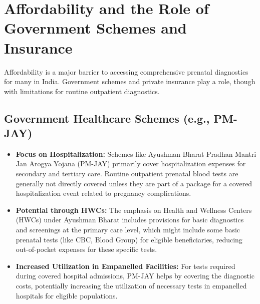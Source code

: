 \documentclass{article}
\begin{document}
\section{Affordability and the Role of Government Schemes and Insurance}

Affordability is a major barrier to accessing comprehensive prenatal diagnostics for many in India. Government schemes and private insurance play a role, though with limitations for routine outpatient diagnostics.

\subsection{Government Healthcare Schemes (e.g., PM-JAY)}
\begin{itemize}
    \item \textbf{Focus on Hospitalization:} Schemes like Ayushman Bharat Pradhan Mantri Jan Arogya Yojana (PM-JAY) primarily cover hospitalization expenses for secondary and tertiary care. Routine outpatient prenatal blood tests are generally not directly covered unless they are part of a package for a covered hospitalization event related to pregnancy complications.
    \item \textbf{Potential through HWCs:} The emphasis on Health and Wellness Centers (HWCs) under Ayushman Bharat includes provisions for basic diagnostics and screenings at the primary care level, which might include some basic prenatal tests (like CBC, Blood Group) for eligible beneficiaries, reducing out-of-pocket expenses for these specific tests.
    \item \textbf{Increased Utilization in Empanelled Facilities:} For tests required during covered hospital admissions, PM-JAY helps by covering the diagnostic costs, potentially increasing the utilization of necessary tests in empanelled hospitals for eligible populations.
\end{itemize}
\end{document}
